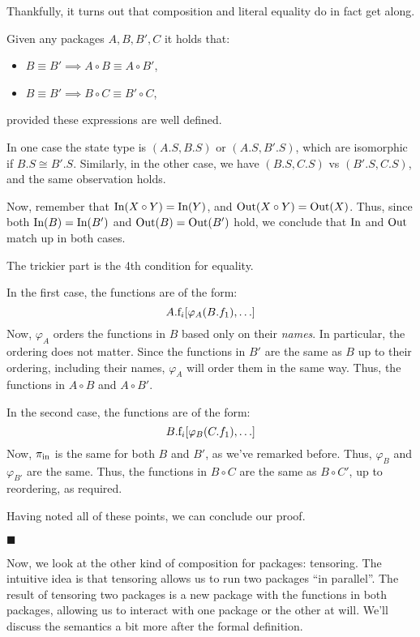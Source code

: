 Thankfully, it turns out that composition and literal equality do
in fact get along.

\begin{lemma}
    Given any packages $A, B, B', C$ it holds that:
    \begin{itemize}
        \item $B \equiv B' \implies A \circ B \equiv A \circ B'$,
        \item $B \equiv B' \implies B \circ C \equiv B' \circ C$,
    \end{itemize}
    provided these expressions are well defined.

     In one case the state type is $(A.S, B.S)$
    or $(A.S, B'.S)$, which are isomorphic if $B.S \cong B'.S$.
    Similarly, in the other case, we have $(B.S, C.S)$ vs $(B'.S, C.S)$,
    and the same observation holds.

    Now, remember that $\text{In}(X \circ Y) = \text{In}(Y)$, and $\text{Out}(X \circ Y) = \text{Out}(X)$.
    Thus, since both $\text{In}(B) = \text{In}(B')$ and $\text{Out}(B) = \text{Out}(B')$
    hold, we conclude that $\text{In}$ and $\text{Out}$ match up in both cases.

    The trickier part is the 4th condition for equality.

    In the first case, the functions are of the form:
    $$
    A.\text{f}_i[\varphi_A(B.f_1), \ldots]
    $$
    Now, $\varphi_A$ orders the functions in $B$ based only on their \emph{names}.
    In particular, the ordering does not matter.
    Since the functions in $B'$ are the same as $B$ up to their ordering,
    including their names,
    $\varphi_A$ will order them in the same way.
    Thus, the functions in $A \circ B$ and $A \circ B'$.

    In the second case, the functions are of the form:
    $$
    B.\text{f}_i[\varphi_B(C.f_1), \ldots]
    $$
    Now, $\pi_{\text{in}}$ is the same for both $B$ and $B'$, as we've remarked
    before.
    Thus, $\varphi_B$ and $\varphi_{B'}$ are the same.
    Thus, the functions in $B \circ C$ are the same as $B \circ C'$,
    up to reordering, as required.

    Having noted all of these points, we can conclude our proof.

    $\blacksquare$
\end{lemma}

Now, we look at the other kind of composition for packages:
tensoring.
The intuitive idea is that tensoring allows us to run two
packages ``in parallel''.
The result of tensoring two packages is a new package with the functions
in both packages, allowing us to interact with one package or the other at will.
We'll discuss the semantics a bit more after the formal definition.


